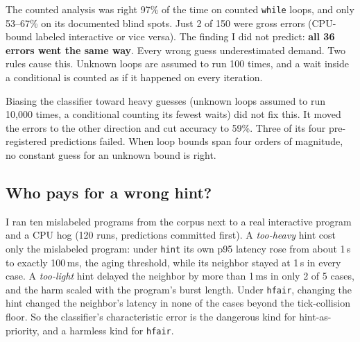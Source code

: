 \documentclass[10pt,twocolumn]{article}
\newcommand{\us}{\,\textmu s}
\newcommand{\ms}{\,ms}
\newcommand{\pol}[1]{\texttt{#1}}
\begin{document}
The counted analysis was right 97\% of the time on counted \texttt{while} loops, and only
53--67\% on its documented blind spots. Just 2 of 150 were gross errors (CPU-bound
labeled interactive or vice versa). The finding I did not predict: \textbf{all 36 errors
went the same way}. Every wrong guess underestimated demand. Two rules cause this. Unknown
loops are assumed to run 100 times, and a wait inside a conditional is counted as if it
happened on every iteration.

Biasing the classifier toward heavy guesses (unknown loops assumed to run 10{,}000 times, a
conditional counting its fewest waits) did not fix this. It moved the errors to the other
direction and cut accuracy to 59\%. Three of its four pre-registered predictions failed. When
loop bounds span four orders of magnitude, no constant guess for an unknown bound is right.

\subsection{Who pays for a wrong hint?}
I ran ten mislabeled programs from the corpus next to a real interactive program and a CPU
hog (120 runs, predictions committed first). A \emph{too-heavy} hint cost only the
mislabeled program: under \pol{hint} its own p95 latency rose from about 1\us{} to exactly
100\ms{}, the aging threshold, while its neighbor stayed at 1\us{} in every case. A
\emph{too-light} hint delayed the neighbor by more than 1\ms{} in only 2 of 5 cases, and the
harm scaled with the program's burst length. Under \pol{hfair}, changing the hint changed
the neighbor's latency in none of the cases beyond the tick-collision floor. So the
classifier's characteristic error is the dangerous kind for hint-as-priority, and a harmless
kind for \pol{hfair}.
\end{document}
